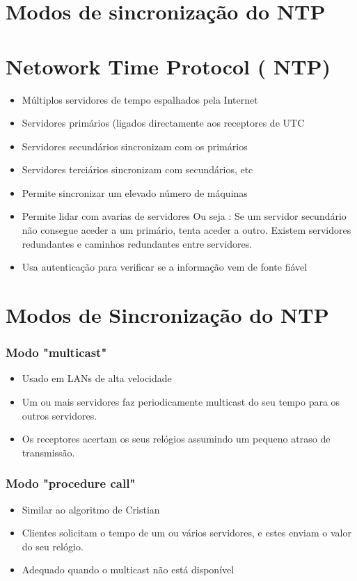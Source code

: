 \documentclass{article}
\begin{document}
\section{Modos de sincronização do NTP}

\section{Netowork Time Protocol ( NTP) }

\begin{itemize}
    \item Múltiplos servidores de tempo espalhados pela Internet
    \item Servidores primários (ligados directamente aos receptores de UTC
    \item Servidores secundários sincronizam com os primários
    \item Servidores terciários sincronizam com secundários, etc
    \item  Permite sincronizar um elevado número de máquinas
    \item Permite lidar com avarias de servidores 
        Ou seja : 
        Se um servidor secundário não consegue aceder a um primário, tenta aceder a outro. Existem servidores redundantes e caminhos redundantes entre servidores.
        
    \item Usa autenticação para verificar se a informação vem de fonte fiável
    
\end{itemize}


\section{Modos de Sincronização do NTP }

\subsubsection{Modo "multicast"}
\begin{itemize}
    \item Usado em LANs de alta velocidade
    \item Um ou mais servidores faz periodicamente multicast do seu tempo para os outros servidores. 
    \item Os receptores acertam os seus relógios assumindo um pequeno atraso de transmissão. 
\end{itemize}


\subsubsection{Modo "procedure call"}
\begin{itemize}
    \item Similar ao algoritmo de Cristian
    \item Clientes solicitam o tempo de um ou vários servidores, e estes enviam o valor do seu relógio. 
    \item Adequado quando o multicast não está disponível
\end{itemize}
\end{document}
